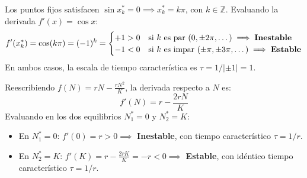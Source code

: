 \begin{example}[Campo trigonométrico $\dot{x} = \sin x$]
    Los puntos fijos satisfacen $\sin x_k^* = 0 \implies x_k^* = k\pi$, con $k \in \mathbb{Z}$. Evaluando la derivada $f'(x) = \cos x$:
    \begin{equation}
        f'(x_k^*) = \cos(k\pi) = (-1)^k = \begin{cases} 
            +1 > 0 & \text{si } k \text{ es par } (0, \pm 2\pi, \dots) \implies \text{\textbf{Inestable}} \\
            -1 < 0 & \text{si } k \text{ es impar } (\pm \pi, \pm 3\pi, \dots) \implies \text{\textbf{Estable}}
        \end{cases}
    \end{equation}
    En ambos casos, la escala de tiempo característica es $\tau = 1/| \pm 1 | = 1$.
\end{example}

\begin{example}[Modelo logístico $\dot{N} = rN(1 - N/K)$]
    Reescribiendo $f(N) = rN - \frac{rN^2}{K}$, la derivada respecto a $N$ es:
    \begin{equation}
        f'(N) = r - \frac{2rN}{K}
    \end{equation}
    Evaluando en los dos equilibrios $N_1^* = 0$ y $N_2^* = K$:
    \begin{itemize}
        \item En $N_1^* = 0$: $f'(0) = r > 0 \implies$ \textbf{Inestable}, con tiempo característico $\tau = 1/r$.
        \item En $N_2^* = K$: $f'(K) = r - \frac{2rK}{K} = -r < 0 \implies$ \textbf{Estable}, con idéntico tiempo característico $\tau = 1/r$.
    \end{itemize}
\end{example}


